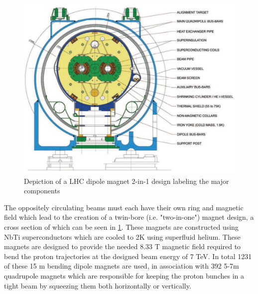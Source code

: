 \begin{figure}[!htbp] 
  \begin{center}
    \includegraphics[width=0.9\linewidth]{figures/lhc/dipole.jpg}
    \caption{ Depiction of a LHC dipole magnet 2-in-1 design labeling the major
components} 
    \label{fig:dipole} 
  \end{center} 
\end{figure}

The oppositely circulating beams must each  have their own ring and magnetic field
which lead to the creation of a twin-bore (i.e. "two-in-one") magnet design, a
cross section of which can be seen in \cref{fig:dipole}. These magnets are constructed
using NbTi superconductors which are cooled to 2K using superfluid helium.
These magnets are designed to provide the needed 8.33 T magnetic field required
to bend the proton trajectories at the designed beam energy of 7 TeV.  In total 1231 of these 15
m bending dipole magnets are used, in association with 392 5-7m
quadrupole magnets which are responsible for keeping the proton bunches in a
tight beam by squeezing them both horizontally or vertically.
